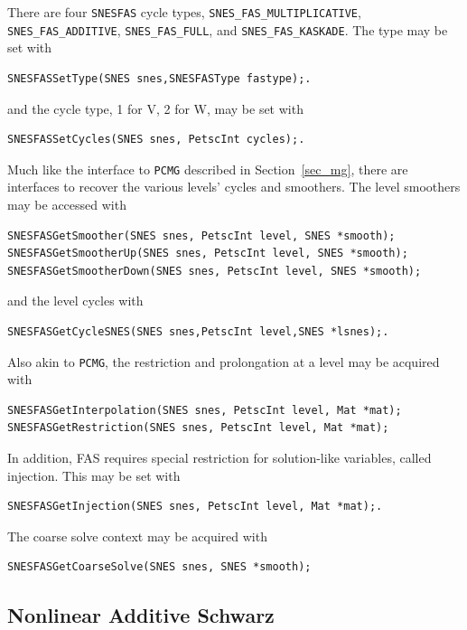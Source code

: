 There are four \lstinline{SNESFAS} cycle
types, \lstinline{SNES_FAS_MULTIPLICATIVE}, \lstinline{SNES_FAS_ADDITIVE}, \break\lstinline{SNES_FAS_FULL},
and \lstinline{SNES_FAS_KASKADE}.
The type may be set with
\begin{lstlisting}
SNESFASSetType(SNES snes,SNESFASType fastype);.
\end{lstlisting}
\noindent and the cycle type, 1 for V, 2 for W, may be set with
\begin{lstlisting}
SNESFASSetCycles(SNES snes, PetscInt cycles);.
\end{lstlisting}
Much like the interface to \lstinline{PCMG} described in Section~\ref{sec_mg}, there are
interfaces to recover the various levels' cycles and smoothers. The level
smoothers may be accessed with
\begin{lstlisting}
SNESFASGetSmoother(SNES snes, PetscInt level, SNES *smooth);
SNESFASGetSmootherUp(SNES snes, PetscInt level, SNES *smooth);
SNESFASGetSmootherDown(SNES snes, PetscInt level, SNES *smooth);
\end{lstlisting}
\noindent and the level cycles with
\begin{lstlisting}
SNESFASGetCycleSNES(SNES snes,PetscInt level,SNES *lsnes);.
\end{lstlisting}
Also akin to \lstinline{PCMG}, the restriction and prolongation at a level may be acquired with
\begin{lstlisting}
SNESFASGetInterpolation(SNES snes, PetscInt level, Mat *mat);
SNESFASGetRestriction(SNES snes, PetscInt level, Mat *mat);
\end{lstlisting}
In addition, FAS requires special restriction for solution-like variables,
called injection.  This may be set with
\begin{lstlisting}
SNESFASGetInjection(SNES snes, PetscInt level, Mat *mat);.
\end{lstlisting}
The coarse solve context may be acquired with
\begin{lstlisting}
SNESFASGetCoarseSolve(SNES snes, SNES *smooth);
\end{lstlisting}

\subsection{Nonlinear Additive Schwarz}

